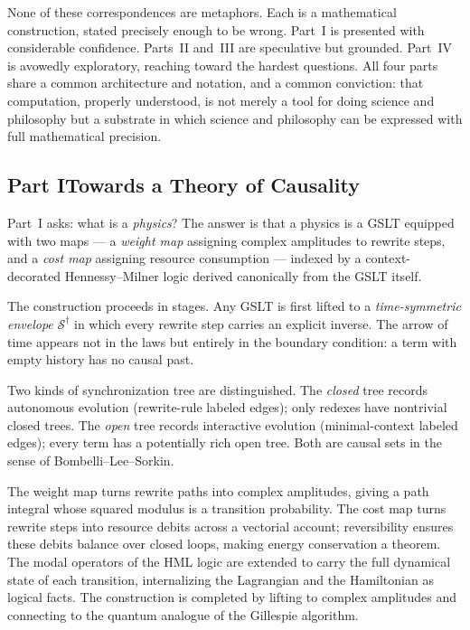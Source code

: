 \documentclass[12pt,openright,twoside]{book}
\theoremstyle{remark}
\theoremstyle{plain}
\theoremstyle{remark}
\theoremstyle{plain}
\theoremstyle{plain}
\newcommand{\GSLT}{\mathcal{S}}
\begin{document}
None of these correspondences are metaphors.
Each is a mathematical construction, stated precisely enough to
be wrong.
Part~I is presented with considerable confidence.
Parts~II and~III are speculative but grounded.
Part~IV is avowedly exploratory, reaching toward the hardest
questions.
All four parts share a common architecture and notation, and a
common conviction: that computation, properly understood, is not
merely a tool for doing science and philosophy but a substrate
in which science and philosophy can be expressed with full
mathematical precision.

\bigskip

\subsection*{Part I\quad Towards a Theory of Causality}

Part~I asks: what is a \emph{physics}?
The answer is that a physics is a GSLT equipped with two maps ---
a \emph{weight map} assigning complex amplitudes to rewrite steps,
and a \emph{cost map} assigning resource consumption --- indexed by
a context-decorated Hennessy--Milner logic derived canonically from
the GSLT itself.

The construction proceeds in stages.
Any GSLT is first lifted to a \emph{time-symmetric envelope}
$\GSLT^\dagger$ in which every rewrite step carries an explicit
inverse.
The arrow of time appears not in the laws but entirely in the
boundary condition: a term with empty history has no causal past.

Two kinds of synchronization tree are distinguished.
The \emph{closed} tree records autonomous evolution (rewrite-rule
labeled edges); only redexes have nontrivial closed trees.
The \emph{open} tree records interactive evolution (minimal-context
labeled edges); every term has a potentially rich open tree.
Both are causal sets in the sense of Bombelli--Lee--Sorkin.

The weight map turns rewrite paths into complex amplitudes,
giving a path integral whose squared modulus is a transition
probability.
The cost map turns rewrite steps into resource debits across a
vectorial account; reversibility ensures these debits balance
over closed loops, making energy conservation a theorem.
The modal operators of the HML logic are extended to carry the full
dynamical state of each transition, internalizing the Lagrangian
and the Hamiltonian as logical facts.
The construction is completed by lifting to complex amplitudes and
connecting to the quantum analogue of the Gillespie algorithm.
\end{document}
